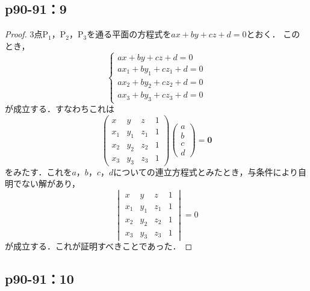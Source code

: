 \documentclass[uplatex,dvipdfmx,a4paper,10pt,fleqn]{jsarticle}
\begin{document}
\newpage 

\subsection*{p90-91：9}

\begin{tleftbar}
    \begin{proof}
    3点$\mathrm{P}_1$，$\mathrm{P_2}$，$\mathrm{P_3}$を通る平面の方程式を$ax+by+cz+d=0$とおく．
    このとき，
    \[
        \begin{cases}
            ax+by+cz + d =0 \\
            ax_1 + by_1 +cz_1 +d =0 \\
            ax_2 + by_2 +cz_2 +d =0 \\
            ax_3 + by_3 +cz_3 +d =0
        \end{cases}
    \]
    が成立する．すなわちこれは
    \[
        \begin{pmatrix} 
            x & y & z & 1 \\
            x_1 & y_1 & z_1& 1 \\
            x_2 & y_2 &z_2 & 1 \\
            x_3 & y_3 &z_3 & 1 
        \end{pmatrix}
        \begin{pmatrix}
            a \\
            b \\
            c \\
            d 
        \end{pmatrix}
        = \bm{0}
    \]
    をみたす．これを$a$，$b$，$c$，$d$についての連立方程式とみたとき，与条件により自明でない解があり，
    \[
    \begin{vmatrix} 
        x & y & z & 1 \\
        x_1 & y_1 & z_1& 1 \\
        x_2 & y_2 &z_2 & 1 \\
        x_3 & y_3 &z_3 & 1 
    \end{vmatrix}
    =0
    \]
    が成立する．これが証明すべきことであった．
\end{proof}
\end{tleftbar}

\newpage

\subsection*{p90-91：10}
\end{document}
